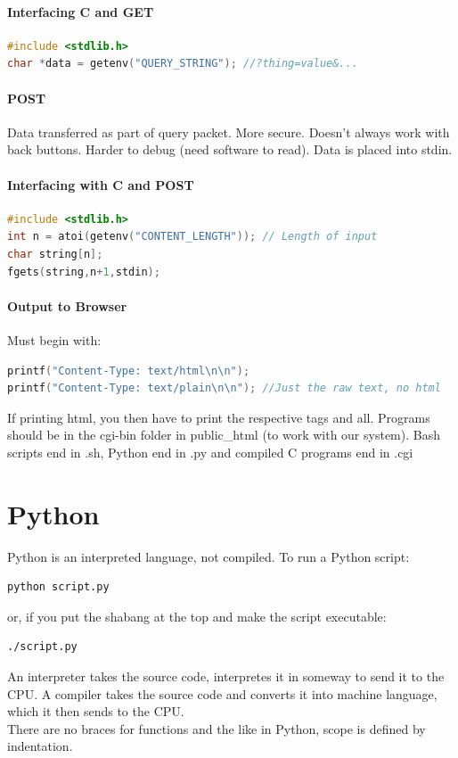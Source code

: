 \documentclass[12 pt]{article}
\begin{document}
\paragraph{Interfacing C and GET}
\begin{lstlisting}[language=c]
#include <stdlib.h>
char *data = getenv("QUERY_STRING"); //?thing=value&...
\end{lstlisting}
\paragraph{POST} Data transferred as part of query packet. More secure. Doesn't always work with back buttons. Harder to debug (need software to read). Data is placed into stdin.
\paragraph{Interfacing with C and POST}
\begin{lstlisting}[language=c]
#include <stdlib.h>
int n = atoi(getenv("CONTENT_LENGTH")); // Length of input
char string[n];
fgets(string,n+1,stdin);
\end{lstlisting}
\paragraph{Output to Browser}Must begin with:
\begin{lstlisting}[language=c]
printf("Content-Type: text/html\n\n");
printf("Content-Type: text/plain\n\n"); //Just the raw text, no html
\end{lstlisting}
If printing html, you then have to print the respective tags and all. Programs should be in the cgi-bin folder in public\_html (to work with our system). Bash scripts end in .sh, Python end in .py and compiled C programs end in .cgi
\section{Python}
Python is an interpreted language, not compiled. To run a Python script:
\begin{lstlisting}[language=bash]
python script.py
\end{lstlisting}
or, if you put the shabang at the top and make the script executable:
\begin{lstlisting}[language=bash]
./script.py
\end{lstlisting}
An interpreter takes the source code, interpretes it in someway to send it to the CPU. A compiler takes the source code and converts it into machine language, which it then sends to the CPU.
\\ There are no braces for functions and the like in Python, scope is defined by indentation.
\end{document}

